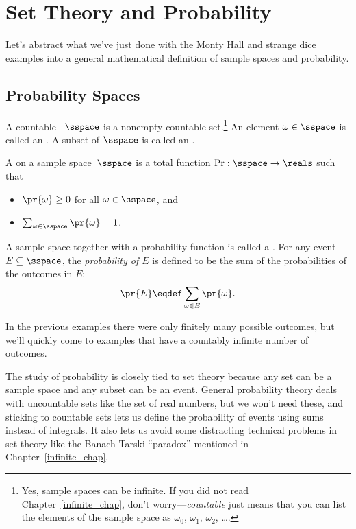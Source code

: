 \section{Set Theory and Probability}\label{probability_sets_sec}

Let's abstract what we've just done with the Monty Hall and strange
dice examples into a general mathematical definition of sample spaces
and probability.

\subsection{Probability Spaces}

\begin{definition}\label{LN12:sampsp}
  A countable ~$\sspace$ is a nonempty countable
  set.\footnote{Yes, sample spaces can be infinite.  If you did not
    read Chapter~\ref{infinite_chap}, don't worry---\emph{countable}
    just means that you can list the elements of the sample space as
    $\omega_0$, $\omega_1$, $\omega_2$, \dots.}  An element $\omega
  \in \sspace$ is called an .  A subset of $\sspace$ is
  called an .
\end{definition}

\begin{definition}\label{LN12:probsp}
 A  on a sample space~$\sspace$ is a total
 function $\operatorname{Pr}: \sspace\to \reals$ such that
\begin{itemize}
\item $\pr{\omega} \geq 0$ for all $\omega \in \sspace$, and
\item $\sum_{\omega \in \sspace} \pr{\omega} = 1$.
\end{itemize}
A sample space together with a probability function is called a
.
For any event $E \subseteq \sspace$, the 
\emph{probability of $E$} is defined to be the sum of the probabilities of
the outcomes in $E$:
\[
    \pr{E} \eqdef \sum_{\omega \in E} \pr{\omega}.
\]
\end{definition}

In the previous examples there were only finitely many possible
outcomes, but we'll quickly come to examples that have a countably
infinite number of outcomes.

The study of probability is closely tied to set theory
because any set can be a sample space and any subset can be an event.
General probability theory deals with uncountable sets like the set of
real numbers, but we won't need these, and sticking to countable
sets lets us define the probability of events using sums instead of
integrals.  It also lets us avoid some distracting technical problems
in set theory like the Banach-Tarski ``paradox'' mentioned in
Chapter~\ref{infinite_chap}.

